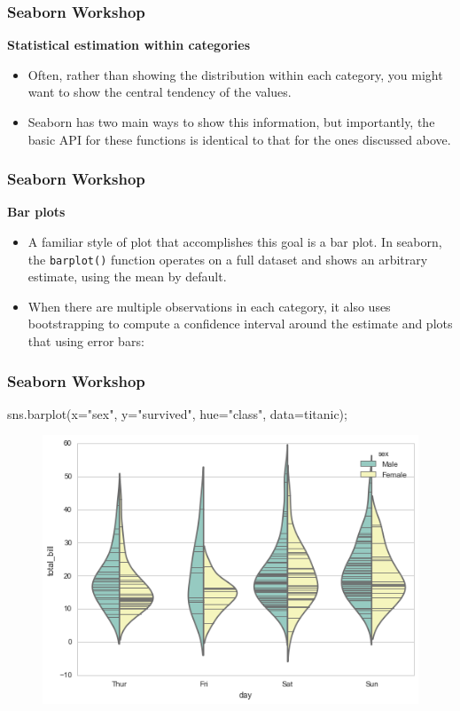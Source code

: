 \documentclass{beamer}
\begin{document}
\begin{frame}[fragile]
	\frametitle{Seaborn Workshop}
\noindent \textbf{Statistical estimation within categories}
\begin{itemize}
\item Often, rather than showing the distribution within each category, you might want to show the central tendency of the values. 
\item Seaborn has two main ways to show this information, but importantly, the basic API for these functions is identical to that for the ones discussed above.
\end{itemize}
\end{frame}

\begin{frame}[fragile]
\frametitle{Seaborn Workshop}
\large
\noindent \textbf{Bar plots}
\begin{itemize}
\item A familiar style of plot that accomplishes this goal is a bar plot. In seaborn, the \texttt{barplot()} function operates on a full dataset and shows an arbitrary estimate, using the mean by default.
\item When there are multiple observations in each category, it also uses bootstrapping to compute a confidence interval around the estimate and plots that using error bars:
\end{itemize}

\end{frame}
\begin{frame}[fragile]
	\frametitle{Seaborn Workshop}
sns.barplot(x="sex", y="survived", hue="class", data=titanic);
\begin{figure}
\centering
\includegraphics[width=0.7\linewidth]{images/categorical_29_0}
\caption{}
\label{fig:categorical_29_0}
\end{figure}
\end{frame}
\end{document}
